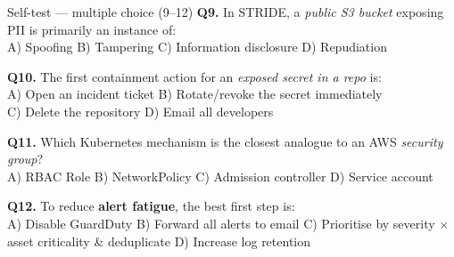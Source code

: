 \documentclass[aspectratio=169,10pt]{beamer}
\newcommand{\term}[1]{{\color{awsink}\textbf{#1}}}
\begin{document}
\begin{frame}{Self-test --- multiple choice (9--12)}
  \footnotesize
  \textbf{Q9.} In STRIDE, a \emph{public S3 bucket} exposing PII is primarily an instance of:\\
  \quad A) Spoofing \quad B) Tampering \quad C) Information disclosure \quad D) Repudiation

  \vspace{0.6em}
  \textbf{Q10.} The first containment action for an \emph{exposed secret in a repo} is:\\
  \quad A) Open an incident ticket \quad B) Rotate/revoke the secret immediately\\
  \quad C) Delete the repository \quad D) Email all developers

  \vspace{0.6em}
  \textbf{Q11.} Which Kubernetes mechanism is the closest analogue to an AWS \emph{security group}?\\
  \quad A) RBAC Role \quad B) NetworkPolicy \quad C) Admission controller \quad D) Service account

  \vspace{0.6em}
  \textbf{Q12.} To reduce \term{alert fatigue}, the best first step is:\\
  \quad A) Disable GuardDuty \quad B) Forward all alerts to email \quad
  C) Prioritise by severity $\times$ asset criticality \& deduplicate \quad D) Increase log retention
\end{frame}
\end{document}
